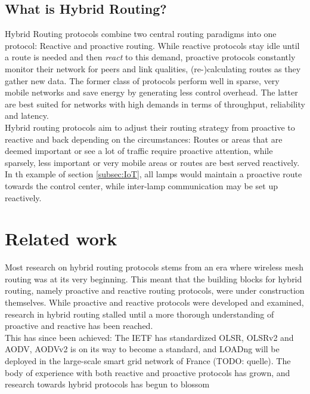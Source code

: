 \documentclass[a4paper,10pt]{scrartcl}
\begin{document}
\subsection{What is Hybrid Routing?}
\label{subsec:hybrid}
Hybrid Routing protocols combine two central routing paradigms into one protocol: Reactive and proactive routing. While reactive protocols stay idle until a route is needed and then \emph{react} to this demand, proactive protocols constantly monitor their network for peers and link qualities, (re-)calculating routes as they gather new data. The former class of protocols perform well in sparse, very mobile networks and save energy by generating less control overhead. The latter are best suited for networks with high demands in terms of throughput, reliability and latency.\\
Hybrid routing protocols aim to adjust their routing strategy from proactive to reactive and back depending on the circumstances: Routes or areas that are deemed important or see a lot of traffic require proactive attention, while sparsely, less important or very mobile areas or routes are best served reactively.\\
In th example of section \ref{subsec:IoT}, all lamps would maintain a proactive route towards the control center, while inter-lamp communication may be set up reactively.

\section{Related work}
\label{sec:related_work}

Most research on hybrid routing protocols stems from an era where wireless mesh routing was at its very beginning. This meant that the building blocks for hybrid routing, namely proactive and reactive routing protocols, were under construction themselves. While proactive and reactive protocols were developed and examined, research in hybrid routing stalled until a more thorough understanding of proactive and reactive has been reached.\\
This has since been achieved: The \gls{IETF} has standardized \gls{OLSR}, OLSRv2  and \gls{AODV}, AODVv2 is on its way to become a standard, and \gls{LOADng} will be deployed in the large-scale smart grid network of France \cite{X800}(TODO: quelle). The body of experience with both reactive and proactive protocols has grown, and research towards hybrid protocols has begun to blossom \cite{baccelli_p2p_rpl} \cite{HYMAD}\\
\end{document}
